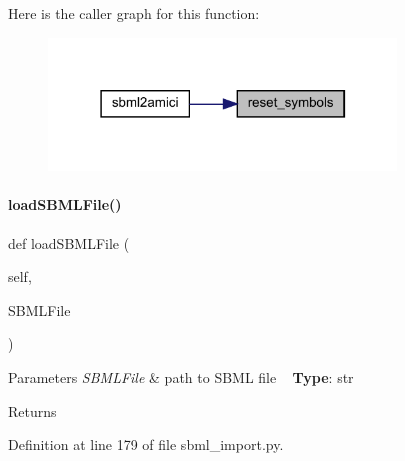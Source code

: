 Here is the caller graph for this function\+:
\nopagebreak
\begin{figure}[H]
\begin{center}
\leavevmode
\includegraphics[width=262pt]{classamici_1_1sbml__import_1_1_sbml_importer_a17147ce5084526fa003563813c1be230_icgraph}
\end{center}
\end{figure}
\mbox{\label{classamici_1_1sbml__import_1_1_sbml_importer_a16147666bbc66b3573fd6d49c4023af1}} 
\paragraph{\texorpdfstring{loadSBMLFile()}{loadSBMLFile()}}
{\footnotesize\ttfamily def load\+S\+B\+M\+L\+File (\begin{DoxyParamCaption}\item[{}]{self,  }\item[{}]{S\+B\+M\+L\+File }\end{DoxyParamCaption})}


\begin{DoxyParams}{Parameters}
{\em S\+B\+M\+L\+File} & path to S\+B\+ML file ~\newline
{\bfseries{Type}}\+: str\\
\hline
\end{DoxyParams}
\begin{DoxyReturn}{Returns}

\end{DoxyReturn}


Definition at line 179 of file sbml\+\_\+import.\+py.

\mbox{\label{classamici_1_1sbml__import_1_1_sbml_importer_ab02f5c6e1bc803fe8223280ebb555a82}} 
